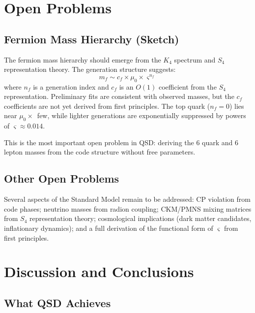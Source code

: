 \documentclass[11pt,a4paper]{article}
\theoremstyle{definition}
\newcommand{\strain}{\varsigma}
\newcommand{\murad}{\mu_0}
\begin{document}
\section{Open Problems}
\label{sec:open}

\subsection{Fermion Mass Hierarchy (Sketch)}

The fermion mass hierarchy should emerge from the $K_4$ spectrum and $S_4$ representation theory. The generation structure suggests:
\begin{equation}
m_f \sim c_f \times \murad \times \strain^{n_f}
\end{equation}
where $n_f$ is a generation index and $c_f$ is an $O(1)$ coefficient from the $S_4$ representation. Preliminary fits are consistent with observed masses, but the $c_f$ coefficients are not yet derived from first principles. The top quark ($n_f = 0$) lies near $\murad \times$~few, while lighter generations are exponentially suppressed by powers of $\strain \approx 0.014$.

This is the most important open problem in QSD: deriving the 6 quark and 6 lepton masses from the code structure without free parameters.

\subsection{Other Open Problems}

Several aspects of the Standard Model remain to be addressed: CP violation from code phases; neutrino masses from radion coupling; CKM/PMNS mixing matrices from $S_4$ representation theory; cosmological implications (dark matter candidates, inflationary dynamics); and a full derivation of the functional form of $\strain$ from first principles.

\section{Discussion and Conclusions}
\label{sec:discussion}

\subsection{What QSD Achieves}
\end{document}
